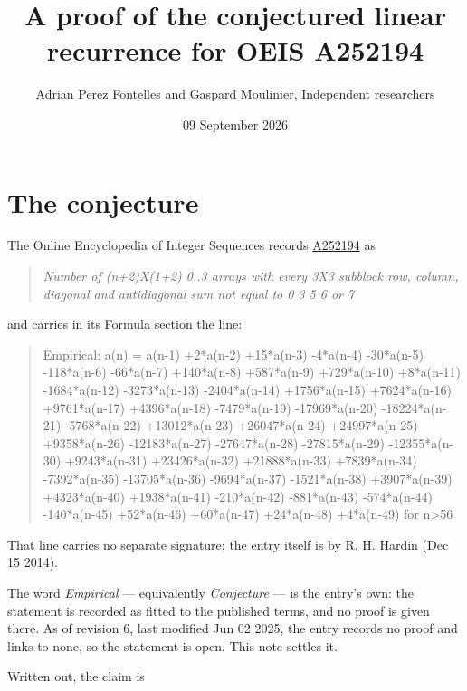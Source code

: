 \documentclass[11pt]{article}
\title{A proof of the conjectured linear recurrence for OEIS A252194}
\author{Adrian Perez Fontelles and Gaspard Moulinier, Independent researchers}
\date{09 September 2026}
\theoremstyle{definition}
\begin{document}
\maketitle
\section{The conjecture}

The Online Encyclopedia of Integer Sequences records \href{https://oeis.org/A252194}{A252194} as

\begin{quote}\itshape Number of (n+2)X(1+2) 0..3 arrays with every 3X3 subblock row, column, diagonal and antidiagonal sum not equal to 0 3 5 6 or 7\end{quote}

and carries in its Formula section the line:

\begin{quote}\ttfamily Empirical: a(n) = a(n-1) +2*a(n-2) +15*a(n-3) -4*a(n-4) -30*a(n-5) -118*a(n-6) -66*a(n-7) +140*a(n-8) +587*a(n-9) +729*a(n-10) +8*a(n-11) -1684*a(n-12) -3273*a(n-13) -2404*a(n-14) +1756*a(n-15) +7624*a(n-16) +9761*a(n-17) +4396*a(n-18) -7479*a(n-19) -17969*a(n-20) -18224*a(n-21) -5768*a(n-22) +13012*a(n-23) +26047*a(n-24) +24997*a(n-25) +9358*a(n-26) -12183*a(n-27) -27647*a(n-28) -27815*a(n-29) -12355*a(n-30) +9243*a(n-31) +23426*a(n-32) +21888*a(n-33) +7839*a(n-34) -7392*a(n-35) -13705*a(n-36) -9694*a(n-37) -1521*a(n-38) +3907*a(n-39) +4323*a(n-40) +1938*a(n-41) -210*a(n-42) -881*a(n-43) -574*a(n-44) -140*a(n-45) +52*a(n-46) +60*a(n-47) +24*a(n-48) +4*a(n-49) for n>56\end{quote}

That line carries no separate signature; the entry itself is by R. H. Hardin (Dec 15 2014).

The word {\itshape Empirical} --- equivalently {\itshape Conjecture} --- is the entry's own: the statement is recorded as fitted to the published terms, and no proof is given there. As of revision 6, last modified Jun 02 2025, the entry records no proof and links to none, so the statement is open. This note settles it.

Written out, the claim is
\end{document}
